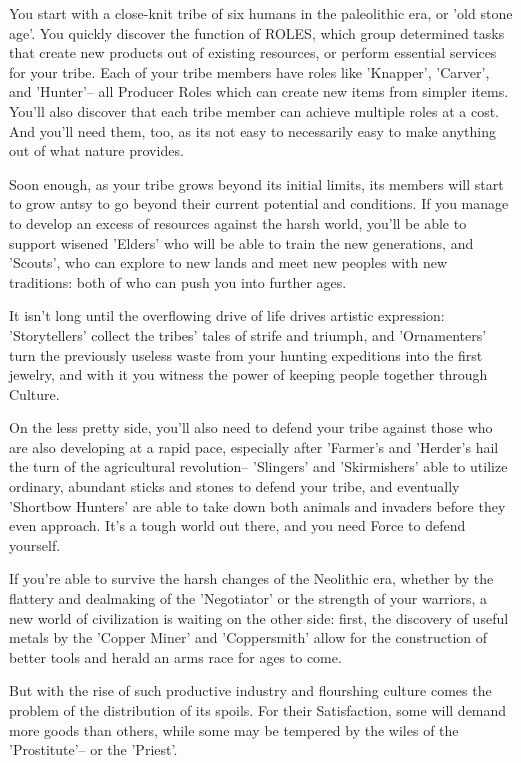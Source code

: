 \documentclass[11pt]{article}
\begin{document}
You start with a close-knit tribe of six humans in the paleolithic era, or 'old stone age'. You quickly discover the function of ROLES, which group determined tasks that create new products out of existing resources, or perform essential services for your tribe. Each of your tribe members have roles like 'Knapper', 'Carver', and 'Hunter'-- all Producer Roles which can create new items from simpler items. You'll also discover that each tribe member can achieve multiple roles at a cost. And you'll need them, too, as its not easy to necessarily easy to make anything out of what nature provides. 

Soon enough, as your tribe grows beyond its initial limits, its members will start to grow antsy to go beyond their current potential and conditions. If you manage to develop an excess of resources against the harsh world, you'll be able to support wisened 'Elders' who will be able to train the new generations, and 'Scouts', who can explore to new lands and meet new peoples with new traditions: both of who can push you into further ages.

It isn't long until the overflowing drive of life drives artistic expression: 'Storytellers' collect the tribes' tales of strife and triumph, and 'Ornamenters' turn the previously useless waste from your hunting expeditions into the first jewelry, and with it you witness the power of keeping people together through Culture. 

On the less pretty side, you'll also need to defend your tribe against those who are also developing at a rapid pace, especially after 'Farmer's and 'Herder's hail the turn of the agricultural revolution-- 'Slingers' and 'Skirmishers' able to utilize ordinary, abundant sticks and stones to defend your tribe, and eventually 'Shortbow Hunters' are able to take down both animals and invaders before they even approach. It's a tough world out there, and you need Force to defend yourself.

If you're able to survive the harsh changes of the Neolithic era, whether by the flattery and dealmaking of the 'Negotiator' or the strength of your warriors, a new world of civilization is waiting on the other side: first, the discovery of useful metals by the 'Copper Miner' and 'Coppersmith' allow for the construction of better tools and herald an arms race for ages to come. 

But with the rise of such productive industry and flourshing culture comes the problem of the distribution of its spoils. For their Satisfaction, some will demand more goods than others, while some may be tempered by the wiles of the 'Prostitute'-- or the 'Priest'.
\end{document}
